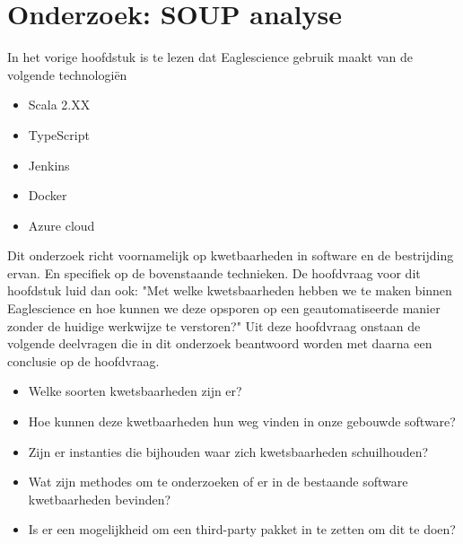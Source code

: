 
\chapter{Onderzoek: SOUP analyse} %

\label{OndSOUPAnalyse} %
In het vorige hoofdstuk is te lezen dat Eaglescience gebruik maakt van de volgende technologi\"en
\begin{itemize}
  \item Scala 2.XX
  \item TypeScript
  \item Jenkins
  \item Docker
  \item Azure cloud
\end{itemize}
Dit onderzoek richt voornamelijk op kwetbaarheden in software en de bestrijding ervan. En specifiek op de bovenstaande technieken. De hoofdvraag voor dit hoofdstuk luid dan ook: "Met welke kwetsbaarheden hebben we te maken binnen Eaglescience en hoe kunnen we deze opsporen op een geautomatiseerde manier zonder de huidige werkwijze te verstoren?" Uit deze hoofdvraag onstaan de volgende deelvragen die in dit onderzoek beantwoord worden met daarna een conclusie op de hoofdvraag.

\begin{itemize}
\item Welke soorten kwetsbaarheden zijn er?
\item Hoe kunnen deze kwetbaarheden hun weg vinden in onze gebouwde software?
\item Zijn er instanties die bijhouden waar zich kwetsbaarheden schuilhouden?
\item Wat zijn methodes om te onderzoeken of er in de bestaande software kwetbaarheden bevinden?
\item Is er een mogelijkheid om een third-party pakket in te zetten om dit te doen?
\end{itemize}


